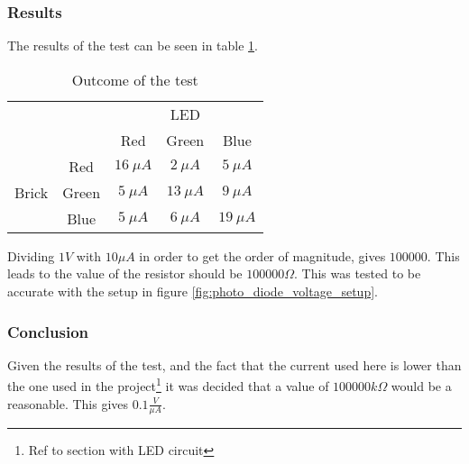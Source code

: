 \subsubsection{Results}
The results of the test can be seen in table \ref{tab::test_pd}.
\begin{table}[H]
\centering
 \begin{tabular}{|ccccc|}
 \hline
  & & \multicolumn{3}{c}{LED} \vline \\ 
  & & Red & Green & Blue \\
  \multirow{3}{*}{Brick}& Red & $16\ \mu A$ & $2\ \mu A$ & $5\ \mu A$ \\ 
  & Green & $5\ \mu A$ & $13\ \mu A$ & $9\ \mu A$ \\
  & Blue & $5\ \mu A$ & $6\ \mu A$ & $19\ \mu A$ \\
  \hline
 \end{tabular}
\caption{Outcome of the test}
\label{tab::test_pd}
\end{table}

Dividing $1 V$ with $10 \mu A$ in order to get the order of magnitude, gives $100 000$. This leads to the value of the resistor should be $100 000 \Omega$.
This was tested to be accurate with the setup in figure \ref{fig:photo_diode_voltage_setup}.

\subsubsection{Conclusion}
Given the results of the test, and the fact that the current used here is lower than the one used in the project\footnote{Ref to section with LED circuit} it was decided that a value of $100 000 k\Omega$ would be a reasonable. This gives $0.1 \frac{V}{\mu A}$.
